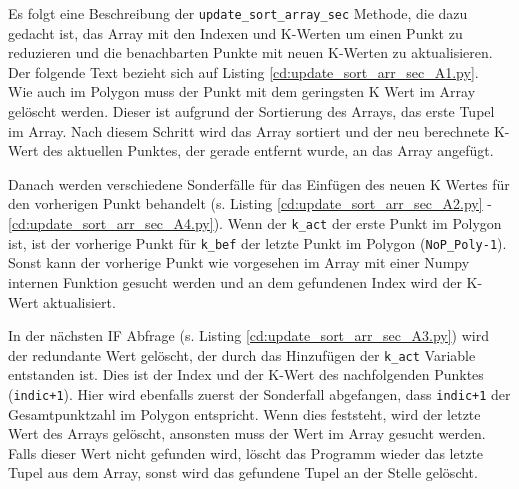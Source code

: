 {	Es folgt eine Beschreibung der \lstinline|update_sort_array_sec| Methode, die dazu gedacht ist, das Array mit den Indexen und K-Werten um einen Punkt zu reduzieren und die benachbarten Punkte mit neuen K-Werten zu aktualisieren. \ifimportant Der folgende Text bezieht sich auf Listing \ref{cd:update_sort_arr_sec_A1.py}. \fi \\
	Wie auch im Polygon muss der Punkt mit dem geringsten K Wert im Array gelöscht werden. Dieser ist aufgrund der Sortierung des Arrays, das erste Tupel im Array. Nach diesem Schritt wird das Array sortiert und der neu berechnete K-Wert des aktuellen Punktes, der gerade entfernt wurde, an das Array angefügt. \\
	\ifimportant
	
	\fi Danach werden verschiedene Sonderfälle für das Einfügen des neuen K Wertes für den vorherigen Punkt behandelt \ifimportant (s. Listing \ref{cd:update_sort_arr_sec_A2.py} - \ref{cd:update_sort_arr_sec_A4.py})\fi. Wenn der \lstinline|k_act| der erste Punkt im Polygon ist, ist der vorherige Punkt für \lstinline|k_bef| der letzte Punkt im Polygon (\lstinline|NoP_Poly-1|). Sonst kann der vorherige Punkt wie vorgesehen im Array mit einer Numpy internen Funktion gesucht werden und an dem gefundenen Index wird der K-Wert aktualisiert. \\
	\ifimportant
	
	\fi In der nächsten IF Abfrage \ifimportant (s. Listing \ref{cd:update_sort_arr_sec_A3.py}) \fi wird der redundante Wert gelöscht, der durch das Hinzufügen der \lstinline|k_act| Variable entstanden ist. Dies ist der Index und der K-Wert des nachfolgenden Punktes (\lstinline|indic+1|). Hier wird ebenfalls zuerst der Sonderfall abgefangen, dass \lstinline|indic+1| der Gesamtpunktzahl im Polygon entspricht. Wenn dies feststeht, wird der letzte Wert des Arrays gelöscht, ansonsten muss der Wert im Array gesucht werden. Falls dieser Wert nicht gefunden wird, löscht das Programm wieder das letzte Tupel aus dem Array, sonst wird das gefundene Tupel an der Stelle gelöscht.
	\ifimportant
	
}

